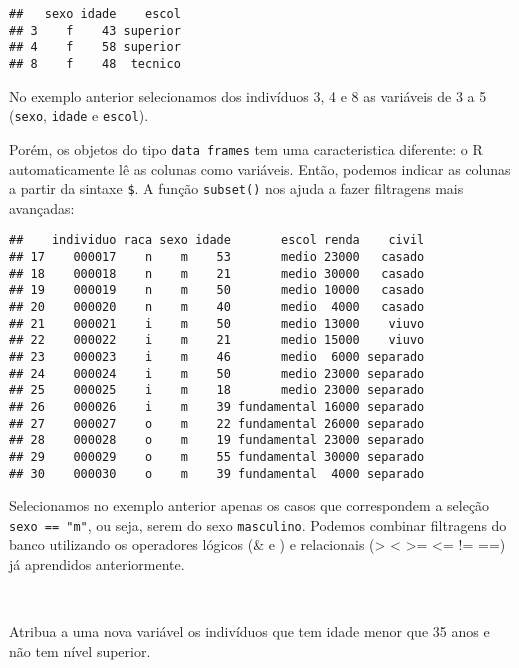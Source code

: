 \documentclass[]{book}
\newenvironment{Shaded}{\begin{snugshade}}{\end{snugshade}}
\newcommand{\KeywordTok}[1]{\textcolor[rgb]{0.13,0.29,0.53}{\textbf{#1}}}
\newcommand{\NormalTok}[1]{#1}
\newcommand{\OperatorTok}[1]{\textcolor[rgb]{0.81,0.36,0.00}{\textbf{#1}}}
\newcommand{\StringTok}[1]{\textcolor[rgb]{0.31,0.60,0.02}{#1}}
\theoremstyle{definition}
\theoremstyle{definition}
\theoremstyle{definition}
\theoremstyle{remark}
\let\BeginKnitrBlock\begin \let\EndKnitrBlock\end
\begin{document}
\begin{verbatim}
##   sexo idade    escol
## 3    f    43 superior
## 4    f    58 superior
## 8    f    48  tecnico
\end{verbatim}

No exemplo anterior selecionamos dos indivíduos 3, 4 e 8 as variáveis de 3 a 5 (\texttt{sexo}, \texttt{idade} e \texttt{escol}).

Porém, os objetos do tipo \texttt{data\ frames} tem uma caracteristica diferente: o R automaticamente lê as colunas como variáveis. Então, podemos indicar as colunas a partir da sintaxe \texttt{\$}. A função \texttt{subset()} nos ajuda a fazer filtragens mais avançadas:

\begin{Shaded}
\end{Shaded}

\begin{verbatim}
##    individuo raca sexo idade       escol renda    civil
## 17    000017    n    m    53       medio 23000   casado
## 18    000018    n    m    21       medio 30000   casado
## 19    000019    n    m    50       medio 10000   casado
## 20    000020    n    m    40       medio  4000   casado
## 21    000021    i    m    50       medio 13000    viuvo
## 22    000022    i    m    21       medio 15000    viuvo
## 23    000023    i    m    46       medio  6000 separado
## 24    000024    i    m    50       medio 23000 separado
## 25    000025    i    m    18       medio 23000 separado
## 26    000026    i    m    39 fundamental 16000 separado
## 27    000027    o    m    22 fundamental 26000 separado
## 28    000028    o    m    19 fundamental 23000 separado
## 29    000029    o    m    55 fundamental 30000 separado
## 30    000030    o    m    39 fundamental  4000 separado
\end{verbatim}

Selecionamos no exemplo anterior apenas os casos que correspondem a seleção \texttt{sexo\ ==\ "m"}, ou seja, serem do sexo \texttt{masculino}. Podemos combinar filtragens do banco utilizando os operadores lógicos (\& e \textbar{}) e relacionais (\textgreater{} \textless{} \textgreater{}= \textless{}= != ==) já aprendidos anteriormente.

~
\BeginKnitrBlock{exercise}
\protect\hypertarget{exr:unnamed-chunk-79}{}{\label{exr:unnamed-chunk-79} }Atribua a uma nova variável os indivíduos que tem idade menor que 35 anos e não tem nível superior.
\EndKnitrBlock{exercise}
\end{document}
